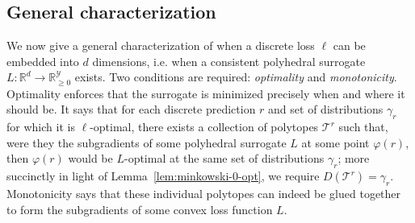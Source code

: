 \documentclass[anon]{colt2020} %
\newcommand{\reals}{\mathbb{R}}
\newcommand{\simplex}{\Delta_\Y}
\newcommand{\T}{\mathcal{T}}
\newcommand{\Y}{\mathcal{Y}}
\newcommand{\Opt}{\mathrm{Opt}}
\begin{document}
\subsection{General characterization}
\label{subsec:gener-char}

We now give a general characterization of when a discrete loss $\ell$ can be embedded into $d$ dimensions, i.e. when a consistent polyhedral surrogate $L: \reals^d \to \reals^{\Y}_{\geq 0}$ exists.
Two conditions are required: \emph{optimality} and \emph{monotonicity}.
Optimality enforces that the surrogate is minimized precisely when and where it should be.
It says that for each discrete prediction $r$ and set of distributions $\gamma_r$ for which it is $\ell$-optimal, there exists a collection of polytopes $\T^r$ such that, were they the subgradients of some polyhedral surrogate $L$ at some point $\varphi(r)$, then $\varphi(r)$ would be $L$-optimal at the same set of distributions $\gamma_r$; more succinctly in light of Lemma~\ref{lem:minkowski-0-opt}, we require $D(\T^r)=\gamma_r$.
Monotonicity says that these individual polytopes can indeed be glued together to form the subgradients of some convex loss function $L$.

\end{document}
